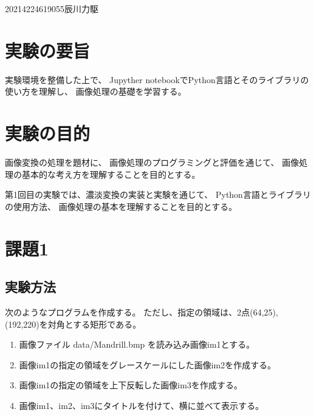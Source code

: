 \documentclass[12pt]{jarticle}
\begin{document}
{2021}{4}{22}{4619055}{辰川力駆}
\section{実験の要旨}

実験環境を整備した上で、
Jupyther notebookでPython言語とそのライブラリの使い方を理解し、
画像処理の基礎を学習する。

\section{実験の目的}

画像変換の処理を題材に、
画像処理のプログラミングと評価を通じて、
画像処理の基本的な考え方を理解することを目的とする。

第1回目の実験では、濃淡変換の実装と実験を通じて、
Python言語とライブラリの使用方法、
画像処理の基本を理解することを目的とする。

\section{課題1}
\subsection{実験方法}
次のようなプログラムを作成する。
ただし、指定の領域は、2点(64,25),(192,220)を対角とする矩形である。
\begin{enumerate}
    \item 画像ファイル data/Mandrill.bmp を読み込み画像im1とする。
    \item 画像im1の指定の領域をグレースケールにした画像im2を作成する。
    \item 画像im1の指定の領域を上下反転した画像im3を作成する。
    \item 画像im1、im2、im3にタイトルを付けて、横に並べて表示する。
\end{enumerate}
\end{document}
